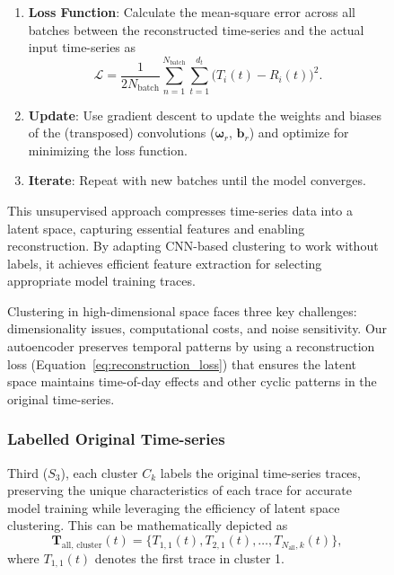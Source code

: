 \begin{figure}[!htbp]
{\begin{enumerate}
\begin{itemize}
        \item \textbf{Encoder Pooling Layer}:
        \begin{footnotesize}
        \begin{equation}
        \boldsymbol{P}_r(t') = \operatorname{MaxPool}\left(\boldsymbol{C}_r((t'-1)l_r+1), \ldots, \boldsymbol{C}_r(t' l_r)\right).
        \end{equation}
        \end{footnotesize}
        \item \textbf{Decoder}: Transposed convolutions for reconstruction.
    \end{itemize}
    \item \textbf{Loss Function}: Calculate the mean-square error across all batches between the reconstructed time-series and the actual input time-series as
    \begin{equation}
    \label{eq:reconstruction_loss}
    \mathcal{L} = \frac{1}{2N_{\text{batch}}} \sum_{n=1}^{N_{\text{batch}}} \sum_{t=1}^{d_t} \Big(T_i(t) - R_i(t) \Big)^2.
    \end{equation}
    \item \textbf{Update}: Use gradient descent to update the weights and biases of the (transposed) convolutions ($\boldsymbol{\omega}_r$, $\boldsymbol{b}_r$) and optimize for minimizing the loss function.
    \item \textbf{Iterate}: Repeat with new batches until the model converges.
\end{enumerate}

This unsupervised approach compresses time-series data into a latent space, capturing essential features and enabling reconstruction. By adapting \ac{CNN}-based clustering to work without labels, it achieves efficient feature extraction for selecting appropriate model training traces.

Clustering in high-dimensional space faces three key challenges: dimensionality issues, computational costs, and noise sensitivity. Our autoencoder preserves temporal patterns by using a reconstruction loss (Equation~\ref{eq:reconstruction_loss}) that ensures the latent space maintains time-of-day effects and other cyclic patterns in the original time-series.

\subsubsection{Labelled Original Time-series}

Third ($S_3$), each cluster \(C_k\) labels the original time-series traces, preserving the unique characteristics of each trace for accurate model training while leveraging the efficiency of latent space clustering. This can be mathematically depicted as
\begin{equation}
\mathbf{T}_{\text{all, cluster}}(t) = \{T_{1,1}(t), T_{2,1}(t), \ldots, T_{N_\text{all},k}(t)\},
\end{equation}
where $T_{1,1}(t)$ denotes the first trace in cluster 1.

}
\end{figure}
